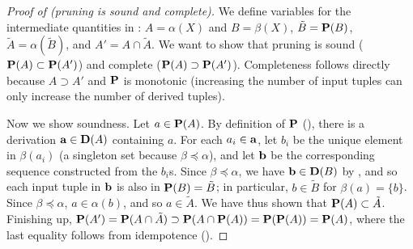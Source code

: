 \begin{proof}[Proof of  (pruning is sound and complete)]
We define variables for the intermediate quantities in :
$A = \alpha(X)$ and $B = \beta(X)$, $\tilde B = \mathbf{P}(B)$, $\tilde A = \alpha(\tilde B)$,
and $A' = A \cap \tilde A$.
We want to show that pruning is sound ($\mathbf{P}(A) \subset \mathbf{P}(A')$)
and complete ($\mathbf{P}(A) \supset \mathbf{P}(A')$).
Completeness follows directly because $A \supset A'$ and $\mathbf{P}$ is monotonic (increasing
the number of input tuples can only increase the number of derived tuples).

Now we show soundness.
Let $a \in \mathbf{P}(A)$.  By definition of $\mathbf{P}$ (), there is a derivation $\mathbf{a} \in \mathbf{D}(A)$ containing $a$.
For each $a_i \in \mathbf{a}$, let $b_i$ be the unique element in $\beta(a_i)$ (a singleton set because $\beta \preceq \alpha$),
and let $\mathbf{b}$ be the corresponding sequence constructed from the $b_i$s.
Since $\beta \preceq \alpha$, we have $\mathbf{b} \in \mathbf{D}(B)$ by ,
and so each input tuple in $\mathbf{b}$ is also in $\mathbf{P}(B) = \tilde B$;
in particular, $b \in \tilde B$ for $\beta(a) = \{ b \}$.
Since $\beta \preceq \alpha$, $a \in \alpha(b)$, and so $a \in \tilde A$.
We have thus shown that $\mathbf{P}(A) \subset \tilde A$.
Finishing up, $\mathbf{P}(A') = \mathbf{P}(A \cap \tilde A) \supset \mathbf{P}(A \cap \mathbf{P}(A)) = \mathbf{P}(\mathbf{P}(A)) = \mathbf{P}(A)$,
where the last equality follows from idempotence ().
\end{proof}

